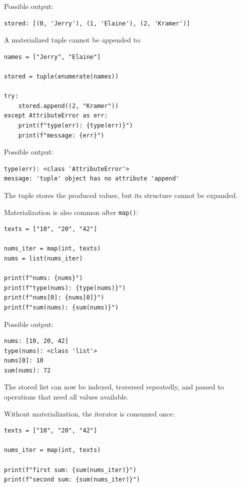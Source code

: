 Possible output:

\begin{verbatim}
stored: [(0, 'Jerry'), (1, 'Elaine'), (2, 'Kramer')]
\end{verbatim}

A materialized tuple cannot be appended to:

\begin{verbatim}
names = ["Jerry", "Elaine"]

stored = tuple(enumerate(names))

try:
    stored.append((2, "Kramer"))
except AttributeError as err:
    print(f"type(err): {type(err)}")
    print(f"message: {err}")
\end{verbatim}

Possible output:

\begin{verbatim}
type(err): <class 'AttributeError'>
message: 'tuple' object has no attribute 'append'
\end{verbatim}

The tuple stores the produced values, but its structure cannot be expanded.

Materialization is also common after \texttt{map()}:

\begin{verbatim}
texts = ["10", "20", "42"]

nums_iter = map(int, texts)
nums = list(nums_iter)

print(f"nums: {nums}")
print(f"type(nums): {type(nums)}")
print(f"nums[0]: {nums[0]}")
print(f"sum(nums): {sum(nums)}")
\end{verbatim}

Possible output:

\begin{verbatim}
nums: [10, 20, 42]
type(nums): <class 'list'>
nums[0]: 10
sum(nums): 72
\end{verbatim}

The stored list can now be indexed, traversed repeatedly, and passed to operations that need all values available.

Without materialization, the iterator is consumed once:

\begin{verbatim}
texts = ["10", "20", "42"]

nums_iter = map(int, texts)

print(f"first sum: {sum(nums_iter)}")
print(f"second sum: {sum(nums_iter)}")
\end{verbatim}

